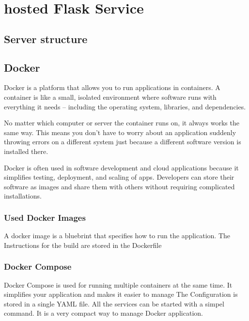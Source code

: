 \chapter{hosted Flask Service}
\label{cha:hosted_flask_service}


\section{Server structure} %




\section{Docker}
Docker is a platform that allows you to run applications in containers. A container is like a small, isolated environment where software runs with everything it needs – including the operating system, libraries, and dependencies.

No matter which computer or server the container runs on, it always works the same way. This means you don’t have to worry about an application suddenly throwing errors on a different system just because a different software version is installed there.

Docker is often used in software development and cloud applications because it simplifies testing, deployment, and scaling of apps. Developers can store their software as images and share them with others without requiring complicated installations.

\subsection{Used Docker Images}
A docker image is a bluebrint that specifies how to run the application. The Instructions for the build are stored in the Dockerfile

\subsection{Docker Compose}
Docker Compose is used for running multiple containers at the same time. It simplifies your application and makes it easier to manage 
The Configuration is stored in a single YAML file. All the services can be started with a simpel command. It is a very compact way to manage Docker application.
\cite{docker_compose} 


